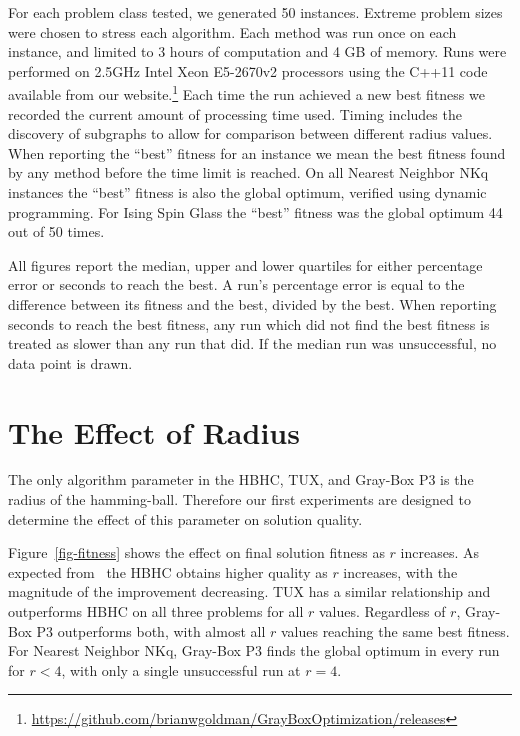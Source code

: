 For each problem class tested, we generated 50 instances.
Extreme problem sizes were chosen to stress each algorithm.
Each method was run once on each instance, and limited to 3 hours of computation and 4 GB of memory.
Runs were performed on 2.5GHz Intel Xeon E5-2670v2 processors using the C++11 code available
from our website.\footnote{\url{https://github.com/brianwgoldman/GrayBoxOptimization/releases}}
Each time the run achieved a new best fitness we recorded the current amount of processing time used.
Timing includes the discovery of subgraphs to allow for comparison between different radius values.
When reporting the ``best'' fitness for an instance we mean the best fitness found by any method before
the time limit is reached. On all Nearest Neighbor NKq instances the ``best'' fitness
is also the global optimum, verified using dynamic programming. For Ising Spin Glass the ``best'' fitness
was the global optimum 44 out of 50 times.

All figures report the median, upper and lower quartiles for either percentage error or seconds to reach the best. A run's percentage error is
equal to the difference between its fitness and the best, divided by the best. When reporting seconds
to reach the best fitness, any run which did not find the best fitness is treated as slower than any run that did.
If the median run was unsuccessful, no data point is drawn.

\section{The Effect of Radius}
\label{sec-radius}
\begin{figure*}
  \centering
  \caption{Comparison of how radius effects solution quality at termination. For NKq-Landscapes $N=6,000$ and $K=4$ and
  for Ising Spin Glasses $N=6,084$. Range of radius values limited by memory constraints.}
  \label{fig-fitness}
\end{figure*}

The only algorithm parameter in the HBHC, TUX, and Gray-Box P3
is the radius of the hamming-ball. Therefore our first experiments are designed to determine
the effect of this parameter on solution quality.

Figure~\ref{fig-fitness} shows the effect on final solution fitness as $r$ increases. As expected
from~\cite{chicano:2014:ball} the HBHC obtains higher quality as $r$ increases, with the magnitude
of the improvement decreasing. TUX has a similar relationship and
outperforms HBHC on all three problems for all $r$ values. Regardless of $r$, Gray-Box P3 outperforms both, with almost
all $r$ values reaching the same best fitness. For Nearest Neighbor NKq, Gray-Box P3 finds the global
optimum in every run for $r < 4$, with only a single unsuccessful run at $r=4$.

